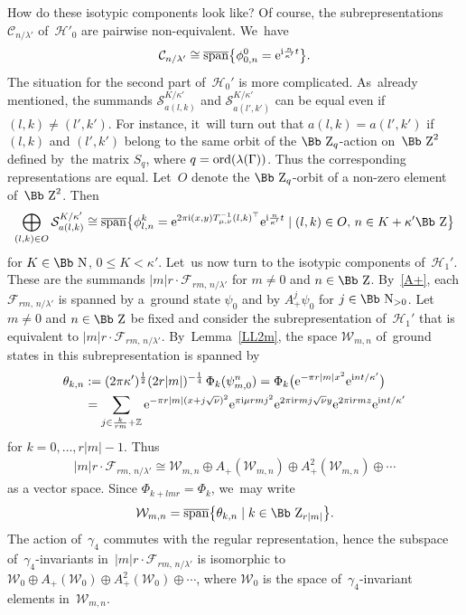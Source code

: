 \documentclass[pdftex]{sigma}
\newcommand\NN{{\mbox{\Bb N}}}
\newcommand\ZZ{{\mbox{\Bb Z}}}
\newcommand\Z{{\mathbb Z}}
\newcommand\cC{{\mathcal C}}
\newcommand\cW{{\mathcal W}}
\newcommand\cH{{\mathcal H}}
\newcommand\cF{{\mathcal F}}
\newcommand{\cSpan}{{\overline{\rm span}}}
\newcommand{\ord}{{\rm ord}}
\numberwithin{equation}{section}
\begin{document}
How do these isotypic components look like? Of course, the subrepresentations $\cC_{n/\lambda'}$ of~$\cH'_0$ are pairwise non-equivalent. We~have
\begin{gather*}
\cC_{n/\lambda'}\cong\cSpan\big\{ \phi^0_{0,n}= {\rm e}^{{\rm i} \frac n{\kappa'} t}\big\}.
\end{gather*}
The situation for the second part of~$\cH_0'$ is more complicated. As~already mentioned, the summands ${\mathcal S}_{a(l,k)}^{K/\kappa'}$ and ${\mathcal S}_{a( l',k')}^{K/\kappa'}$ can be equal even if $(l,k)\not=(l',k')$. For instance, it~will turn out that $a(l,k)=a(l',k')$ if $(l,k)$ and $(l',k')$ belong to the same orbit of the $\ZZ_q$-action on~$\ZZ^2$ defined by~the matrix $S_q$, where $q=\ord(\lambda(\Gamma))$. Thus the corresponding representations are equal. Let~$O$ denote the $\ZZ_q$-orbit of a non-zero element of~$\ZZ^2$. Then
%
\begin{gather*}
\bigoplus _{(l,k)\in O} {\mathcal S}_{a(l,k)}^{K/\kappa'}\cong
\cSpan\big\{ \phi_{l,n}^k={\rm e}^{2\pi {\rm i}(x,y)T_{\mu,\nu}^{-1}(l,k)^\top} {\rm e}^{{\rm i} \frac n{\kappa'} t}\mid (l,k)\in O,\, n\in K+\kappa'\ZZ\big\}
\end{gather*}
for $K\in \NN$, $0\le K<\kappa'$. Let~us now turn to the isotypic components of~$\cH_1'$. These are the summands $|m|r\cdot \cF_{rm,\,n/\lambda'}$ for $m\not=0$ and $n\in\ZZ$. By~\eqref{A+}, each $\cF_{rm,\,n/\lambda'}$ is spanned by a~ground state $\psi_0$ and by $A_+^j\psi_0$ for $j\in\NN_{>0}$. Let~$m\not=0$ and $n\in\ZZ$ be fixed and consider the subrepresentation of~$\cH_1'$ that is equivalent to $|m|r\cdot \cF_{rm,\,n/\lambda'}$. By~Lemma~\ref{LL2m}, the space ${\mathcal W}_{m,n}$ of~ground states in this subrepresentation is spanned by
\begin{align*}
\theta_{k,n}&:=(2\pi\kappa')^{\frac12}(2r|m|)^{-\frac14}\,\Phi_k(\psi^n_{m,0})
=\Phi_k\big({\rm e}^{-\pi r |m|x^2}{\rm e}^{{\rm i}nt/\kappa'}\big)
\\
&= \sum_{j\in \frac k{rm}+\Z}
{\rm e}^{-\pi r |m|(x+j\sqrt\nu)^2}{\rm e}^{\pi {\rm i}\mu rmj^2}{\rm e}^{2\pi {\rm i}rmj\sqrt\nu y}{\rm e}^{2\pi {\rm i}rmz}{\rm e}^{{\rm i}nt/\kappa'}
\end{align*}
for $k=0,\dots,r|m|-1$. Thus
\begin{gather*}
|m|r\cdot \cF_{rm,\,n/\lambda'}\cong {\mathcal W}_{m,n}\oplus A_+({\mathcal W}_{m,n})\oplus A_+^2({\mathcal W}_{m,n})\oplus\cdots
\end{gather*}
as a vector space.
Since $\Phi_{k+lmr}=\Phi_k$, we~may write
\begin{gather*}
{\mathcal W}_{m,n}=\cSpan\big\{\theta_{k,n}\mid k\in \ZZ_{r|m|}\big\}.
\end{gather*}
The action of~$\gamma_4$ commutes with the regular representation, hence the subspace of~$\gamma_4$-invariants in~$|m|r\cdot \cF_{rm,\,n/\lambda'}$ is isomorphic to
${\cW_0}\oplus A_+({\cW_0})\oplus A_+^2({\mathcal W}_0)\oplus\cdots$, where $\cW_0$ is the space of~$\gamma_4$-invariant elements in~$\cW_{m,n}$.
\end{document}
